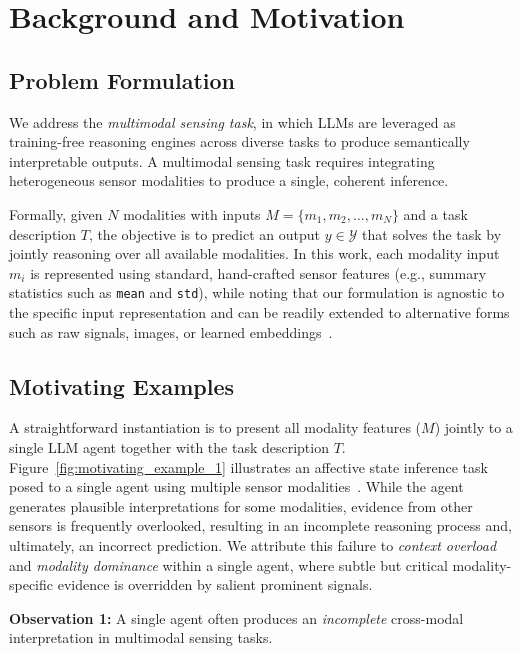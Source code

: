 \section{Background and Motivation}
\label{sec:motivation}

\subsection{Problem Formulation}

We address the \textit{multimodal sensing task}, in which LLMs are leveraged as training-free reasoning engines across diverse tasks to produce semantically interpretable outputs. A multimodal sensing task requires integrating heterogeneous sensor modalities to produce a single, coherent inference.

Formally, given $N$ modalities with inputs $M = \{m_1, m_2, \ldots, m_N\}$ and a task description $T$, the objective is to predict an output $y\in\mathcal{Y}$ that solves the task by jointly reasoning over all available modalities. In this work, each modality input $m_i$ is represented using standard, hand-crafted sensor features (e.g., summary statistics such as \texttt{mean} and \texttt{std}), while noting that our formulation is agnostic to the specific input representation and can be readily extended to alternative forms such as raw signals, images, or learned embeddings~\citep{fewshothealth, bymyeyes, sensorlm}.

\subsection{Motivating Examples}

A straightforward instantiation is to present all modality features ($M$) jointly to a single LLM agent together with the task description $T$. Figure~\ref{fig:motivating_example_1} illustrates an affective state inference task posed to a single agent using multiple sensor modalities~\citep{wesad}. While the agent generates plausible interpretations for some modalities, evidence from other sensors is frequently overlooked, resulting in an incomplete reasoning process and, ultimately, an incorrect prediction. We attribute this failure to \textit{context overload} and \textit{modality dominance} within a single agent, where subtle but critical modality-specific evidence is overridden by salient prominent signals.

\begin{observationbox}
    \noindent \textbf{Observation 1:} A single agent often produces an \textit{incomplete} cross-modal interpretation in multimodal sensing tasks.
\end{observationbox}

